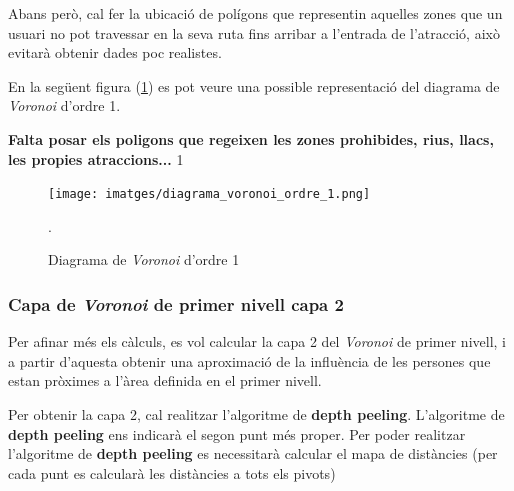 \documentclass[12pt]{article}
\begin{document}
Abans però, cal fer la ubicació de polígons que representin aquelles zones que un usuari no pot travessar en la seva ruta fins arribar a l'entrada de l'atracció, això evitarà obtenir dades poc realistes. 

En la següent figura (\ref{fig:diagrama_voronoi_ordre_1}) es pot veure una possible representació del diagrama de \textit{Voronoi} d'ordre 1.

\textbf{Falta posar els poligons que regeixen les zones prohibides, rius, llacs, les propies atraccions...}
1
\begin{figure}[H]
	\centering
	\texttt{[image: imatges/diagrama\_voronoi\_ordre\_1.png]}\par\vspace{1cm}
	\caption{Diagrama de \textit{Voronoi} d'ordre 1}.
	\label{fig:diagrama_voronoi_ordre_1}
\end{figure}

\subsubsection{Capa de \textit{Voronoi} de primer nivell capa 2}
Per afinar més els càlculs, es vol calcular la capa 2 del \textit{Voronoi} de primer nivell, i a partir d'aquesta obtenir una aproximació de la influència de les persones que estan pròximes a l'àrea definida en el primer nivell.

Per obtenir la capa 2, cal realitzar l'algoritme de \textbf{depth peeling}. L'algoritme de \textbf{depth peeling} ens indicarà el segon punt més proper. Per poder realitzar l'algoritme de \textbf{depth peeling} es necessitarà calcular el mapa de distàncies (per cada punt es calcularà les distàncies a tots els pivots)





\end{document}
